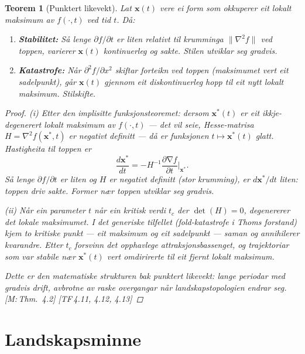 \documentclass[10pt]{book}
\theoremstyle{definition}
\theoremstyle{plain}
\newtheorem{teorem}[definisjon]{Teorem}
\theoremstyle{remark}
\newcommand{\norm}[1]{\lVert #1 \rVert}
\DeclareMathOperator{\grad}{\nabla}
\newcommand{\TF}[1]{\textnormal{[TF\,#1]}}
\newcommand{\Mref}[1]{\textnormal{[M:\,#1]}}
\begin{document}
\begin{teorem}[Punktert likevekt]\label{thm:punktert}
Lat $\bm{x}(t)$ vere ei form som okkuperer eit lokalt maksimum av $f(\cdot, t)$ ved tid $t$. D\aa:

\begin{enumerate}[label=(\roman*)]
  \item \textbf{Stabilitet:} S\aa{} lenge $\partial f / \partial t$ er liten relativt til krumminga $\norm{\nabla^2 f}$ ved toppen, varierer $\bm{x}(t)$ kontinuerleg og sakte. Stilen utviklar seg gradvis.
  \item \textbf{Katastrofe:} N\aa r $\partial^2 f / \partial x^2$ skiftar forteikn ved toppen (maksimumet vert eit sadelpunkt), g\aa r $\bm{x}(t)$ gjennom eit diskontinuerleg hopp til eit nytt lokalt maksimum. Stilskifte.
\end{enumerate}

\begin{proof}
\textit{(i)} Etter den implisitte funksjonsteoremet: dersom $\bm{x}^*(t)$ er eit ikkje-degenerert lokalt maksimum av $f(\cdot, t)$ --- det vil seie, Hesse-matrisa $H = \nabla^2 f(\bm{x}^*, t)$ er negativt definitt --- d\aa{} er funksjonen $t \mapsto \bm{x}^*(t)$ glatt. Hastigheita til toppen er
\[
  \frac{d\bm{x}^*}{dt} = -H^{-1} \frac{\partial \grad f}{\partial t}\bigg|_{\bm{x}^*}.
\]
S\aa{} lenge $\partial f / \partial t$ er liten og $H$ er negativt definitt (stor krumming), er $d\bm{x}^*/dt$ liten: toppen driv sakte. Former n\ae r toppen utviklar seg gradvis.

\textit{(ii)} N\aa r ein parameter $t$ n\aa r ein kritisk verdi $t_c$ der $\det(H) = 0$, degenererer det lokale maksimumet. I det generiske tilfellet (fold-katastrofe i Thoms forstand) kjem to kritiske punkt --- eit maksimum og eit sadelpunkt --- saman og annihilerer kvarandre. Etter $t_c$ forsvinn det opphavlege attraksjonsbassenget, og trajektoriar som var stabile n\ae r $\bm{x}^*(t)$ vert omdirirerte til eit fjernt lokalt maksimum.

Dette er den matematiske strukturen bak punktert likevekt: lange periodar med gradvis drift, avbrotne av raske overgangar n\aa r landskapstopologien endrar seg. \Mref{Thm.~4.2} \TF{4.11, 4.12, 4.13}
\end{proof}
\end{teorem}

\section{Landskapsminne}\label{sec:dyn:minne}
\end{document}
